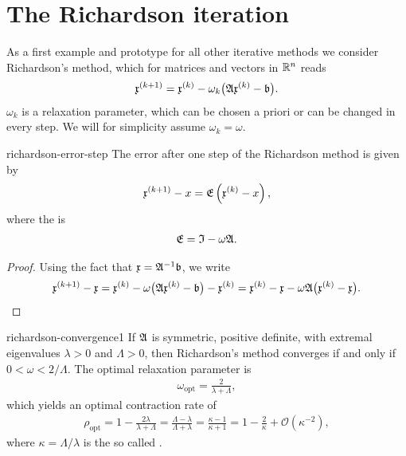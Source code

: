
\section{The Richardson iteration}

\begin{intro}
  As a first example and prototype for all other iterative methods we
  consider Richardson's method, which for matrices and vectors in
  $\mathbb R^n$ reads
  \begin{gather}
    \label{eq:richardson:1}
    \mathfrak{x}^{(k+1)}
    = \mathfrak{x}^{(k)}
    - \omega_k \bigl(\mathfrak{A} \mathfrak{x}^{(k)} - \mathfrak{b} \bigr).
  \end{gather}
  $\omega_k$ is a relaxation parameter, which can be chosen a priori
  or can be changed in every step. We will for simplicity assume
  $\omega_k = \omega$.
\end{intro}  

\begin{Lemma}{richardson-error-step}
  \label{lemma:richardson:1}
  The error after one step of the Richardson method is given by
  \begin{gather}
    \label{eq:richardson:14}
    \mathfrak{x}^{(k+1)} - x = \mathfrak{E} \left(
      \mathfrak{x}^{(k)} - x \right),
  \end{gather}
  where the  is
  \begin{gather}
    \label{eq:richardson:15}
    \mathfrak{E} = \mathfrak{I} - \omega \mathfrak{A}.
  \end{gather}
\end{Lemma}

\begin{proof}
  Using the fact that $\mathfrak{x} = \mathfrak{A}^{-1} \mathfrak{b}$, we write
  \begin{gather*}
    \mathfrak{x}^{(k+1)} - \mathfrak{x} 
    = \mathfrak{x}^{(k)}
    - \omega \bigl(\mathfrak{A} \mathfrak{x}^{(k)} - \mathfrak{b} \bigr) -  \mathfrak{x}^{(k)}
    =  \mathfrak{x}^{(k)} - \mathfrak{x} - \omega \mathfrak{A} \bigl(
     \mathfrak{x}^{(k)} -  \mathfrak{x} \bigr).
  \end{gather*}
\end{proof}

\begin{Theorem}{richardson-convergence1}
  \label{theorem:richardson:1}
  If $\mathfrak{A}$ is symmetric, positive definite, with extremal
  eigenvalues $\lambda>0$ and $\Lambda>0$, then Richardson's method
  converges if and only if $0 < \omega < 2/\Lambda$. The optimal
  relaxation parameter is 
  \begin{gather}
    \label{eq:richardson:2}
    \omega_{\text{opt}} = \frac{2}{\lambda+\Lambda},
  \end{gather}
  which yields an optimal contraction rate of
  \begin{gather}
    \label{eq:richardson:4}
    \rho_{\text{opt}}
    = 1-\frac{2\lambda}{\lambda+\Lambda}
    = \frac{\Lambda-\lambda}{\Lambda+\lambda}
    = \frac{\kappa-1}{\kappa+1}
    = 1 -\frac2\kappa + \mathcal
    O\left(\kappa^{-2}\right),
  \end{gather}
  where $\kappa = \Lambda/\lambda$ is the so called .
\end{Theorem}

